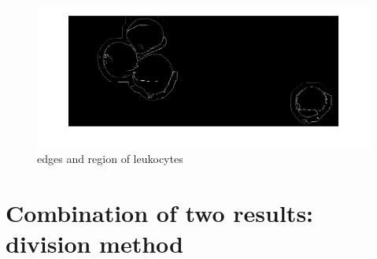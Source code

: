 \begin{figure}
	\begin{center}
		\centering
		\includegraphics[scale=0.5]{img/Pmedonlyleuko.png}
		\caption{edges and region of leukocytes}
		\label{fig:Pmedonlyleu}
	\end{center}
\end{figure}
\section{Combination of two results: division method}
